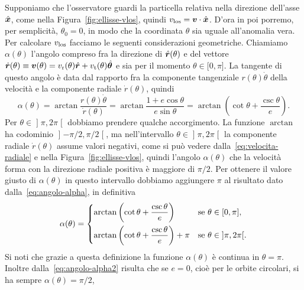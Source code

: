 {Supponiamo che l'osservatore guardi la particella relativa nella direzione
dell'asse $\hat{\bm{x}}$, come nella Figura~\ref{fig:ellisse-vlos}, quindi
$v_\textup{los} = \bm{v}\cdot\hat{\bm{x}}$. D'ora in poi porremo, per semplicità,
$\theta_0 = 0$, in modo che la coordinata $\theta$ sia uguale all'anomalia
vera. Per calcolare $v_\textup{los}$ facciamo le seguenti considerazioni
geometriche. Chiamiamo $\alpha(\theta)$ l'angolo compreso fra la direzione di
$\hat{\bm{r}}(\theta)$ e del vettore $\dot{\bm{r}}(\theta) \equiv \bm{v}(\theta) =
v_{\textup{r}}(\theta)\hat{\bm{r}} + v_{\textup{t}}(\theta)\hat{\bm{\theta}}$ e sia
per il momento $\theta \in \mathopen{[}0, \pi\mathclose{]}$. La tangente di
questo angolo è data dal rapporto fra la componente tangenziale
$r(\theta)\dot{\theta}$ della velocità e la componente radiale
$\dot{r}(\theta)$, quindi
\begin{equation}
  \label{eq:angolo-alpha}
  \alpha(\theta) = \arctan\frac{r(\theta)\dot{\theta}}{\dot{r}(\theta)} =
  \arctan\frac{1 + e\cos\theta}{e\sin\theta} = \arctan
  \left(
    \cot\theta + \frac{\csc\theta}{e}
  \right).
\end{equation}
Per $\theta \in \mathopen{]}\pi, 2\pi\mathclose{[}$ dobbiamo prendere qualche
accorgimento. La funzione $\arctan$ ha codominio
$\mathopen{]}-\pi/2, \pi/2\mathclose{[}$, ma nell'intervallo
$\theta \in \mathopen{]}\pi, 2\pi\mathclose{[}$ la componente radiale
$\dot{r}(\theta)$ assume valori negativi, come si può vedere
dalla~\eqref{eq:velocita-radiale} e nella Figura~\ref{fig:ellisse-vlos}, quindi
l'angolo $\alpha(\theta)$ che la velocità forma con la direzione radiale
positiva è maggiore di $\pi/2$. Per ottenere il valore giusto di
$\alpha(\theta)$ in questo intervallo dobbiamo aggiungere $\pi$ al risultato
dato dalla~\eqref{eq:angolo-alpha}, in definitiva
\begin{equation}
  \label{eq:angolo-alpha2}
  \alpha(\theta) =
  \begin{dcases}
    \arctan
    \left(
      \cot\theta + \frac{\csc\theta}{e}
    \right) & \text{se $\theta \in \mathopen{[}0, \pi\mathclose{]}$,}\\
    \arctan
    \left(
      \cot\theta + \frac{\csc\theta}{e}
    \right) + \pi & \text{se $\theta \in \mathopen{]}\pi, 2\pi\mathclose{[}$.}
  \end{dcases}
\end{equation}
Si noti che grazie a questa definizione la funzione $\alpha(\theta)$ è continua
in $\theta = \pi$. Inoltre dalla~\eqref{eq:angolo-alpha2} risulta che se $e=0$,
cioè per le orbite circolari, si ha sempre $\alpha(\theta) = \pi/2$,
}
